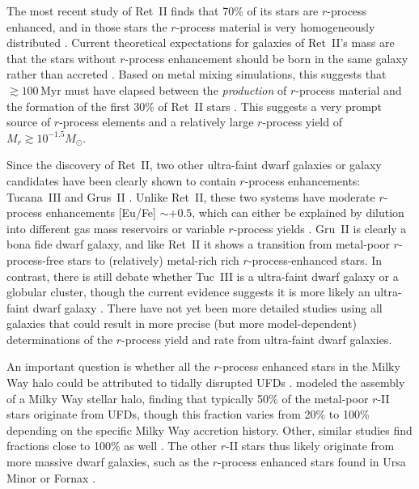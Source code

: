 \documentclass[letterpaper]{article}
\begin{document}
The most recent study of Ret~II finds that 70\% of its stars are $r$-process enhanced, and in those stars the $r$-process material is very homogeneously distributed \citep{Ji2022}.
Current theoretical expectations for galaxies of Ret~II's mass are that the stars without $r$-process enhancement should be born in the same galaxy rather than accreted \citep{Griffen2018}.
Based on metal mixing simulations, this suggests that ${\gtrsim}100$\,Myr must have elapsed between the \emph{production} of $r$-process material and the formation of the first 30\% of Ret~II stars \citep{Tarumi2020}. This suggests a very prompt source of $r$-process elements and a relatively large $r$-process yield of $M_r \gtrsim 10^{-1.5} M_\odot$.

Since the discovery of Ret~II, two other ultra-faint dwarf galaxies or galaxy candidates have been clearly shown to contain $r$-process enhancements: Tucana~III \citep{Hansen2017} and Grus~II \citep{Hansen2020}.
Unlike Ret~II, these two systems have moderate $r$-process enhancements [Eu/Fe] $\sim +0.5$, which can either be explained by dilution into different gas mass reservoirs \citep{Safarzadeh2017,Tarumi2020} or variable $r$-process yields \citep{Ji2019b}.
Gru~II is clearly a bona fide dwarf galaxy, and like Ret~II it shows a transition from metal-poor $r$-process-free stars to (relatively) metal-rich rich $r$-process-enhanced stars.
In contrast, there is still debate whether Tuc~III is a ultra-faint dwarf galaxy or a globular cluster, though the current evidence suggests it is more likely an ultra-faint dwarf galaxy \citep{Marshall2019}.
There have not yet been more detailed studies using all galaxies that could result in more precise (but more model-dependent) determinations of the $r$-process yield and rate from ultra-faint dwarf galaxies.

An important question is whether all the $r$-process enhanced stars in the Milky Way halo could be attributed to tidally disrupted UFDs \citep{Tsujimoto14b,Ishimaru15,Ji2016c,Ojima2018}.
\citet{Brauer2019} modeled the assembly of a Milky Way stellar halo, finding that typically 50\% of the metal-poor $r$-II stars originate from UFDs, though this fraction varies from 20\% to 100\% depending on the specific Milky Way accretion history. Other, similar studies find fractions close to 100\% as well \citep{hirai22}. The other $r$-II stars thus likely originate from more massive dwarf galaxies, such as the $r$-process enhanced stars found in Ursa Minor \citep{Cohen2010} or Fornax \citep{Reichert2021}.
\end{document}
